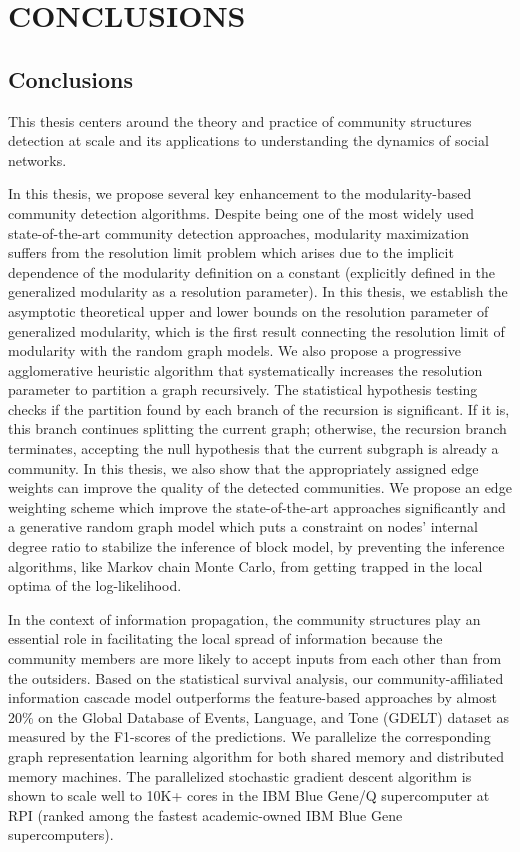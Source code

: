\chapter{CONCLUSIONS}
\label{chap:conclusions}

\section{Conclusions}
This thesis centers around the theory and practice of community structures detection at scale and its applications to understanding the dynamics of social networks. 

In this thesis, we propose several key enhancement to the modularity-based community detection algorithms. Despite being one of the most widely used state-of-the-art community detection approaches, modularity maximization suffers from the resolution limit problem which arises due to the implicit dependence of the modularity definition on a constant (explicitly defined in the generalized modularity as a resolution parameter). In this thesis, we establish the asymptotic theoretical upper and lower bounds on the resolution parameter of generalized modularity, which is the first result connecting the resolution limit of modularity with the random graph models. We also propose a progressive agglomerative heuristic algorithm that systematically increases the resolution parameter to partition a graph recursively. The statistical hypothesis testing checks if the partition found by each branch of the recursion is significant. If it is, this branch continues splitting the current graph; otherwise, the recursion branch terminates, accepting the null hypothesis that the current subgraph is already a community. In this thesis, we also show that the appropriately assigned edge weights can improve the quality of the detected communities. We propose an edge weighting scheme which improve the state-of-the-art approaches significantly and a generative random graph model which puts a constraint on nodes' internal degree ratio to stabilize the inference of block model, by preventing the inference algorithms, like Markov chain Monte Carlo, from getting trapped in the local optima of the log-likelihood.

In the context of information propagation, the community structures play an essential role in facilitating the local spread of information because the community members are more likely to accept inputs from each other than from the outsiders. Based on the statistical survival analysis, our community-affiliated information cascade model outperforms the feature-based approaches by almost 20\% on the Global Database of Events, Language, and Tone (GDELT) dataset as measured by the F1-scores of the predictions. We parallelize the corresponding graph representation learning algorithm for both shared memory and distributed memory machines. The parallelized stochastic gradient descent algorithm is shown to scale well to 10K+ cores in the IBM Blue Gene/Q supercomputer at RPI (ranked among the fastest academic-owned IBM Blue Gene supercomputers).

